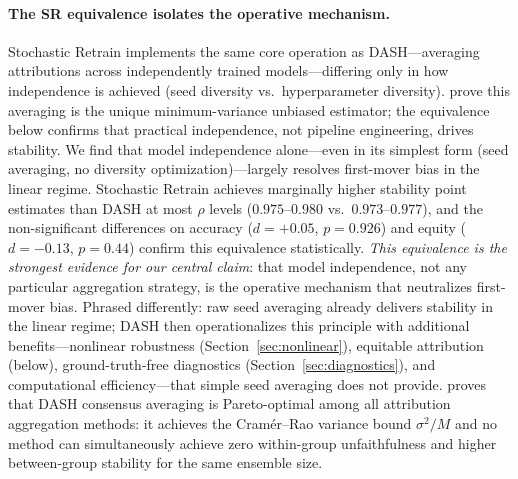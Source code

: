 \documentclass[10pt]{article}
\newcommand{\dash}{\textsc{DASH}}
\newcommand{\rhovar}{\rho}
\begin{document}
\paragraph{The SR equivalence isolates the operative mechanism.}
Stochastic Retrain implements the same core operation as
\dash{}---averaging attributions across independently trained
models---differing only in how independence is achieved (seed diversity
vs.\ hyperparameter diversity).  \citet{caraker2026impossibility}
prove this averaging is the unique
minimum-variance unbiased estimator; the equivalence below confirms
that practical independence, not pipeline engineering, drives stability.
We find that model independence alone---even in its simplest form (seed
averaging, no diversity optimization)---largely resolves first-mover
bias in the linear regime.  Stochastic Retrain achieves marginally
higher stability point estimates than \dash{} at most $\rhovar$ levels
($0.975$--$0.980$ vs.\ $0.973$--$0.977$), and the non-significant
differences on accuracy ($d = +0.05$, $p = 0.926$) and equity
($d = -0.13$, $p = 0.44$) confirm this equivalence statistically.
\emph{This equivalence is the strongest evidence for our central claim}:
that model independence, not any particular aggregation strategy, is the
operative mechanism that neutralizes first-mover bias.  Phrased differently:
raw seed averaging already delivers stability in the linear regime;
\dash{} then operationalizes this principle with additional
benefits---nonlinear robustness (Section~\ref{sec:nonlinear}), equitable
attribution (below), ground-truth-free diagnostics
(Section~\ref{sec:diagnostics}), and computational efficiency---that
simple seed averaging does not provide.
\citet{caraker2026impossibility} proves that
\dash{} consensus averaging is Pareto-optimal among all attribution
aggregation methods: it achieves the Cram\'er--Rao variance bound
$\sigma^2/M$ and no method can simultaneously achieve zero
within-group unfaithfulness and higher between-group stability for the
same ensemble size.
\end{document}
